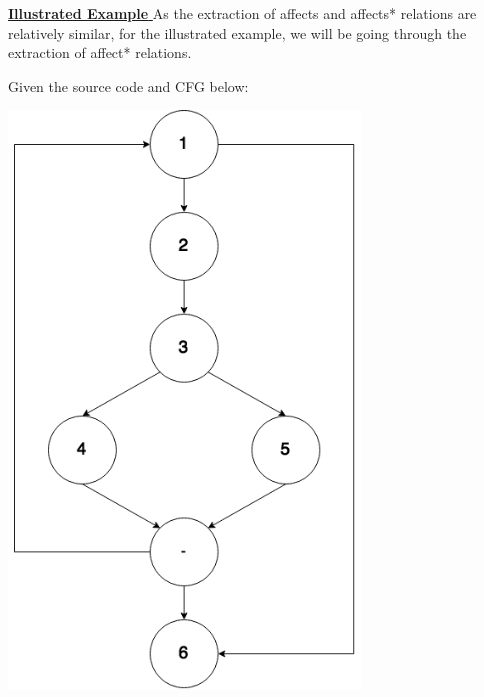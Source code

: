\documentclass[12pt]{article}
\begin{document}
{{{{{{{{{{{{{{{\underline{\textbf{Illustrated Example}
}}\newline
As the extraction of affects and affects* relations are relatively similar, for the illustrated example, we will be going through the extraction of affect* relations. 

Given the source code and CFG below:\newline
\begin{center}
\hspace{10mm}
\hspace{35mm}
\begin{minipage}{14em}
\includegraphics[width=0.7\textwidth]{CFG_Example.png}

\end{minipage}
\end{center}}}}}}}}}}}}}}}
\end{document}
